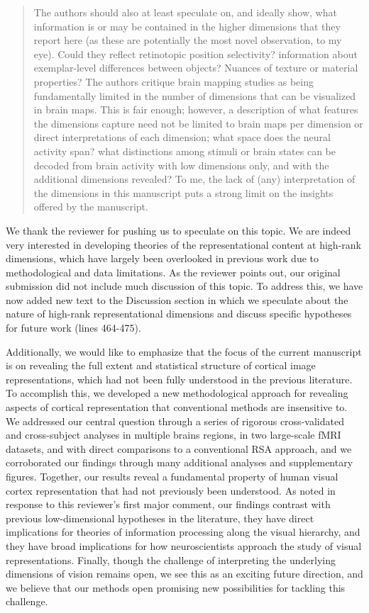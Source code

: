 \documentclass[10pt]{article}
\begin{document}
\begin{quote}
The authors should also at least speculate on, and ideally show, what information is or may be contained in the higher dimensions that they report here (as these are potentially the most novel observation, to my eye). Could they reflect retinotopic position selectivity? information about exemplar-level differences between objects? Nuances of texture or material properties? The authors critique brain mapping studies as being fundamentally limited in the number of dimensions that can be visualized in brain maps. This is fair enough; however, a description of what features the dimensions capture need not be limited to brain maps per dimension or direct interpretations of each dimension; what space does the neural activity span? what distinctions among stimuli or brain states can be decoded from brain activity with low dimensions only, and with the additional dimensions revealed? To me, the lack of (any) interpretation of the dimensions in this manuscript puts a strong limit on the insights offered by the manuscript.
\end{quote}

We thank the reviewer for pushing us to speculate on this topic. We are indeed very interested in developing theories of the representational content at high-rank dimensions, which have largely been overlooked in previous work due to methodological and data limitations. As the reviewer points out, our original submission did not include much discussion of this topic. To address this, we have now added new text to the Discussion section in which we speculate about the nature of high-rank representational dimensions and discuss specific hypotheses for future work (lines 464-475).

Additionally, we would like to emphasize that the focus of the current manuscript is on revealing the full extent and statistical structure of cortical image representations, which had not been fully understood in the previous literature. To accomplish this, we developed a new methodological approach for revealing aspects of cortical representation that conventional methods are insensitive to. We addressed our central question through a series of rigorous cross-validated and cross-subject analyses in multiple brains regions, in two large-scale fMRI datasets, and with direct comparisons to a conventional RSA approach, and we corroborated our findings through many additional analyses and supplementary figures. Together, our results reveal a fundamental property of human visual cortex representation that had not previously been understood. As noted in response to this reviewer's first major comment, our findings contrast with previous low-dimensional hypotheses in the literature, they have direct implications for theories of information processing along the visual hierarchy, and they have broad implications for how neuroscientists approach the study of visual representations. Finally, though the challenge of interpreting the underlying dimensions of vision remains open, we see this as an exciting future direction, and we believe that our methods open promising new possibilities for tackling this challenge.
\end{document}
